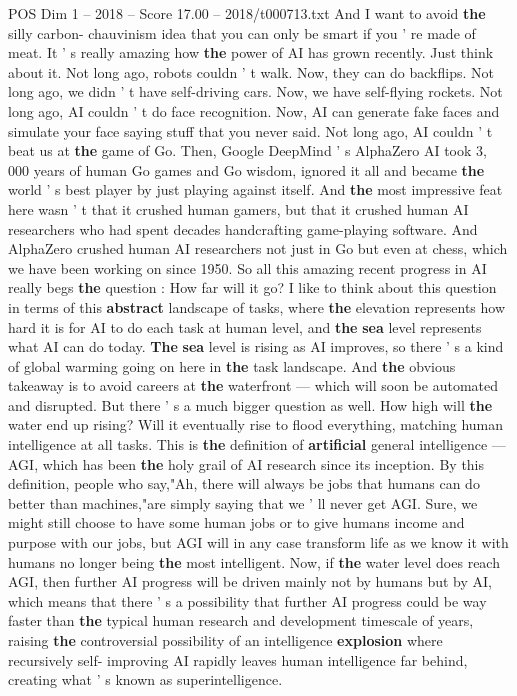 \begin{textsample}{POS Dim 1 – 2018 – Score 17.00 – 2018/t000713.txt}
And I want to avoid \textbf{the} silly carbon- chauvinism idea that you can only be smart if you ' re made of meat.
It ' s really amazing how \textbf{the} power of AI has grown recently.
Just think about it.
Not long ago, robots couldn ' t walk.
Now, they can do backflips.
Not long ago, we didn ' t have self-driving cars.
Now, we have self-flying rockets.
Not long ago, AI couldn ' t do face recognition.
Now, AI can generate fake faces and simulate your face saying stuff that you never said.
Not long ago, AI couldn ' t beat us at \textbf{the} game of Go.
Then, Google DeepMind ' s AlphaZero AI took 3, 000 years of human Go games and Go wisdom, ignored it all and became \textbf{the} world ' s best player by just playing against itself.
And \textbf{the} most impressive feat here wasn ' t that it crushed human gamers, but that it crushed human AI researchers who had spent decades handcrafting game-playing software.
And AlphaZero crushed human AI researchers not just in Go but even at chess, which we have been working on since 1950.
So all this amazing recent progress in AI really begs \textbf{the} question : How far will it go?
I like to think about this question in terms of this \textbf{abstract} landscape of tasks, where \textbf{the} elevation represents how hard it is for AI to do each task at human level, and \textbf{the} \textbf{sea} level represents what AI can do today. \textbf{The} \textbf{sea} level is rising as AI improves, so there ' s a kind of global warming going on here in \textbf{the} task landscape.
And \textbf{the} obvious takeaway is to avoid careers at \textbf{the} waterfront — which will soon be automated and disrupted.
But there ' s a much bigger question as well.
How high will \textbf{the} water end up rising?
Will it eventually rise to flood everything, matching human intelligence at all tasks.
This is \textbf{the} definition of \textbf{artificial} general intelligence — AGI, which has been \textbf{the} holy grail of AI research since its inception.
By this definition, people who say,"Ah, there will always be jobs that humans can do better than machines,"are simply saying that we ' ll never get AGI.
Sure, we might still choose to have some human jobs or to give humans income and purpose with our jobs, but AGI will in any case transform life as we know it with humans no longer being \textbf{the} most intelligent.
Now, if \textbf{the} water level does reach AGI, then further AI progress will be driven mainly not by humans but by AI, which means that there ' s a possibility that further AI progress could be way faster than \textbf{the} typical human research and development timescale of years, raising \textbf{the} controversial possibility of an intelligence \textbf{explosion} where recursively self- improving AI rapidly leaves human intelligence far behind, creating what ' s known as superintelligence.

\end{textsample}
